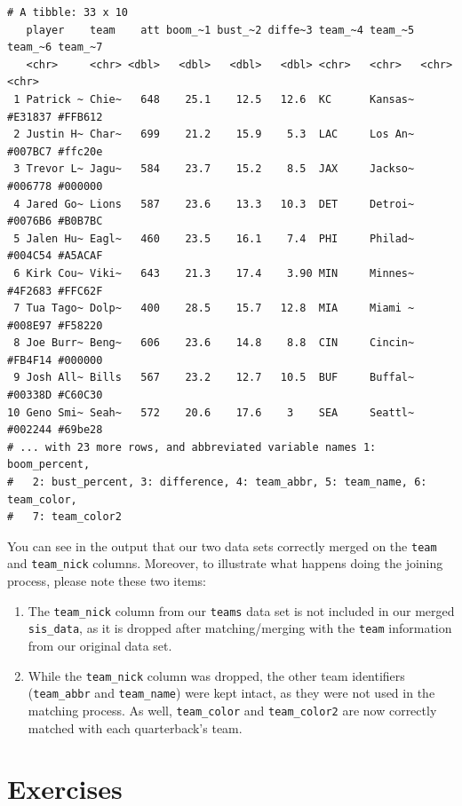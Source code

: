 \documentclass[
  letterpaper,
]{krantz}
\providecommand{\tightlist}{%
  \setlength{\itemsep}{0pt}\setlength{\parskip}{0pt}}\usepackage{longtable,booktabs,array}
\begin{document}
\begin{verbatim}
# A tibble: 33 x 10
   player    team    att boom_~1 bust_~2 diffe~3 team_~4 team_~5 team_~6 team_~7
   <chr>     <chr> <dbl>   <dbl>   <dbl>   <dbl> <chr>   <chr>   <chr>   <chr>  
 1 Patrick ~ Chie~   648    25.1    12.5   12.6  KC      Kansas~ #E31837 #FFB612
 2 Justin H~ Char~   699    21.2    15.9    5.3  LAC     Los An~ #007BC7 #ffc20e
 3 Trevor L~ Jagu~   584    23.7    15.2    8.5  JAX     Jackso~ #006778 #000000
 4 Jared Go~ Lions   587    23.6    13.3   10.3  DET     Detroi~ #0076B6 #B0B7BC
 5 Jalen Hu~ Eagl~   460    23.5    16.1    7.4  PHI     Philad~ #004C54 #A5ACAF
 6 Kirk Cou~ Viki~   643    21.3    17.4    3.90 MIN     Minnes~ #4F2683 #FFC62F
 7 Tua Tago~ Dolp~   400    28.5    15.7   12.8  MIA     Miami ~ #008E97 #F58220
 8 Joe Burr~ Beng~   606    23.6    14.8    8.8  CIN     Cincin~ #FB4F14 #000000
 9 Josh All~ Bills   567    23.2    12.7   10.5  BUF     Buffal~ #00338D #C60C30
10 Geno Smi~ Seah~   572    20.6    17.6    3    SEA     Seattl~ #002244 #69be28
# ... with 23 more rows, and abbreviated variable names 1: boom_percent,
#   2: bust_percent, 3: difference, 4: team_abbr, 5: team_name, 6: team_color,
#   7: team_color2
\end{verbatim}

You can see in the output that our two data sets correctly merged on the
\texttt{team} and \texttt{team\_nick} columns. Moreover, to illustrate
what happens doing the joining process, please note these two items:

\begin{enumerate}
\def\labelenumi{\arabic{enumi}.}
\tightlist
\item
  The \texttt{team\_nick} column from our \texttt{teams} data set is not
  included in our merged \texttt{sis\_data}, as it is dropped after
  matching/merging with the \texttt{team} information from our original
  data set.
\item
  While the \texttt{team\_nick} column was dropped, the other team
  identifiers (\texttt{team\_abbr} and \texttt{team\_name}) were kept
  intact, as they were not used in the matching process. As well,
  \texttt{team\_color} and \texttt{team\_color2} are now correctly
  matched with each quarterback's team.
\end{enumerate}

\hypertarget{exercises}{%
\section{Exercises}\label{exercises}}
\end{document}
